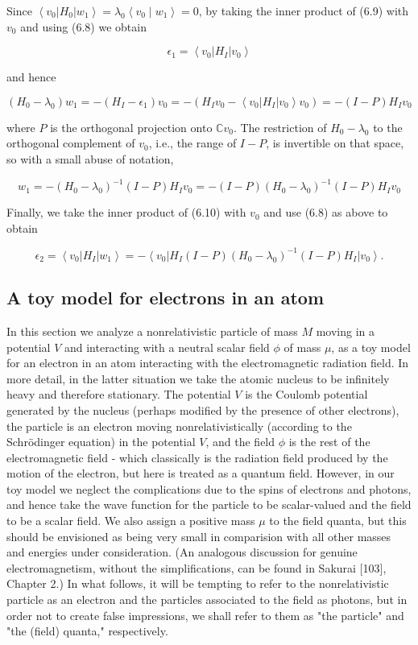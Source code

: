 \documentclass[10pt, letterpaper]{article}
\begin{document}
Since $\left\langle v_{0}\right| H_{0}\left|w_{1}\right\rangle=\lambda_{0}\left\langle v_{0} \mid w_{1}\right\rangle=0$, by taking the inner product of (6.9) with $v_{0}$ and using (6.8) we obtain

$$
\epsilon_{1}=\left\langle v_{0}\right| H_{I}\left|v_{0}\right\rangle
$$

and hence

$$
\left(H_{0}-\lambda_{0}\right) w_{1}=-\left(H_{I}-\epsilon_{1}\right) v_{0}=-\left(H_{I} v_{0}-\left\langle v_{0}\right| H_{I}\left|v_{0}\right\rangle v_{0}\right)=-(I-P) H_{I} v_{0}
$$

where $P$ is the orthogonal projection onto $\mathbb{C} v_{0}$. The restriction of $H_{0}-\lambda_{0}$ to the orthogonal complement of $v_{0}$, i.e., the range of $I-P$, is invertible on that space, so with a small abuse of notation,

$$
w_{1}=-\left(H_{0}-\lambda_{0}\right)^{-1}(I-P) H_{I} v_{0}=-(I-P)\left(H_{0}-\lambda_{0}\right)^{-1}(I-P) H_{I} v_{0}
$$

Finally, we take the inner product of (6.10) with $v_{0}$ and use (6.8) as above to obtain

$$
\epsilon_{2}=\left\langle v_{0}\right| H_{I}\left|w_{1}\right\rangle=-\left\langle v_{0}\right| H_{I}(I-P)\left(H_{0}-\lambda_{0}\right)^{-1}(I-P) H_{I}\left|v_{0}\right\rangle .
$$

\subsection*{A toy model for electrons in an atom}
In this section we analyze a nonrelativistic particle of mass $M$ moving in a potential $V$ and interacting with a neutral scalar field $\phi$ of mass $\mu$, as a toy model for an electron in an atom interacting with the electromagnetic radiation field. In more detail, in the latter situation we take the atomic nucleus to be infinitely heavy and therefore stationary. The potential $V$ is the Coulomb potential generated by the nucleus (perhaps modified by the presence of other electrons), the particle is an electron moving nonrelativistically (according to the Schrödinger equation) in the potential $V$, and the field $\phi$ is the rest of the electromagnetic field - which classically is the radiation field produced by the motion of the electron, but here is treated as a quantum field. However, in our toy model we neglect the complications due to the spins of electrons and photons, and hence take the wave function for the particle to be scalar-valued and the field to be a scalar field. We also assign a positive mass $\mu$ to the field quanta, but this should be envisioned as being very small in comparision with all other masses and energies under consideration. (An analogous discussion for genuine electromagnetism, without the simplifications, can be found in Sakurai [103], Chapter 2.) In what follows, it will be tempting to refer to the nonrelativistic particle as an electron and the particles associated to the field as photons, but in order not to create false impressions, we shall refer to them as "the particle" and "the (field) quanta," respectively.
\end{document}
